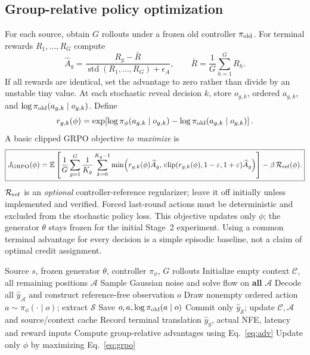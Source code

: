 \documentclass[11pt,a4paper]{article}
\newcommand{\C}{\mathcal C}
\newcommand{\A}{\mathcal A}
\newcommand{\Sset}{\mathcal S}
\newcommand{\E}{\mathbb E}
\begin{document}
\subsection{Group-relative policy optimization}
For each source, obtain $G$ rollouts under a frozen old controller $\pi_{\rm old}$. For terminal rewards $R_1,\ldots,R_G$ compute
\begin{equation}
\widehat A_g=\frac{R_g-\bar R}{\operatorname{std}(R_1,\ldots,R_G)+\epsilon_A},\qquad
\bar R=\frac1G\sum_{h=1}^G R_h.\label{eq:adv}
\end{equation}
If all rewards are identical, set the advantage to zero rather than divide by an unstable tiny value. At each stochastic reveal decision $k$, store $o_{g,k}$, ordered $a_{g,k}$, and $\log\pi_{\rm old}(a_{g,k}\mid o_{g,k})$. Define
\begin{equation}
 r_{g,k}(\phi)=\exp\!\left[\log\pi_\phi(a_{g,k}\mid o_{g,k})-
 \log\pi_{\rm old}(a_{g,k}\mid o_{g,k})\right].
\end{equation}
A basic clipped GRPO objective \emph{to maximize} is
\begin{equation}
\boxed{J_{\rm GRPO}(\phi)=\E\left[
\frac1G\sum_{g=1}^G \frac{1}{K_g}\sum_{k=0}^{K_g-1}
\min\!\left(r_{g,k}(\phi)\widehat A_g,\,
\operatorname{clip}(r_{g,k}(\phi),1-\varepsilon,1+\varepsilon)\widehat A_g\right)
\right]-\beta\,\mathcal R_{\rm ref}(\phi).}\label{eq:grpo}
\end{equation}
$\mathcal R_{\rm ref}$ is an \emph{optional} controller-reference regularizer; leave it off initially unless implemented and verified. Forced last-round actions must be deterministic and excluded from the stochastic policy loss. This objective updates only $\phi$; the generator $\theta$ stays frozen for the initial Stage~2 experiment. Using a common terminal advantage for every decision is a simple episodic baseline, not a claim of optimal credit assignment.

\begin{algorithm}[htbp]
\caption{Stage 2 rollout and policy update (frozen generator)}\label{alg:rl}
\begin{algorithmic}[1]
\Require Source $s$, frozen generator $\theta$, controller $\pi_\phi$, $G$ rollouts
  \State Initialize empty context $\C$, all remaining positions $\A$
  \While{$\A\ne\varnothing$ and budget permits}
    \State Sample Gaussian noise and solve flow on \textbf{all} $\A$
    \State Decode all $\widehat y_{\A}$ and construct reference-free observation $o$
    \State Draw nonempty ordered action $a\sim\pi_\phi(\cdot\mid o)$; extract $\Sset$
    \State Save $o,a,\log\pi_{\rm old}(a\mid o)$
    \State Commit only $\widehat y_{\Sset}$; update $\C,\A$ and source/context cache
  \EndWhile
  \State Record terminal translation $\widehat y_g$, actual NFE, latency and reward inputs
\EndFor
\State Compute group-relative advantages using Eq.~\eqref{eq:adv}
\State Update only $\phi$ by maximizing Eq.~\eqref{eq:grpo}
\end{algorithmic}
\end{algorithm}
\end{document}
